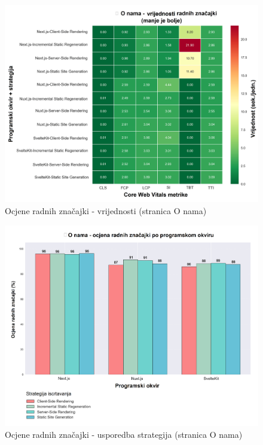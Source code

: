 \begin{figure}[H]
    \centering
    \includegraphics[width=\textwidth]{slike/rezultati/about/about_performance_values.png}
    \caption{Ocjene radnih značajki - vrijednosti (stranica O nama)}
    \label{fig:testiranje-o-nama-vrijednosti}
\end{figure}

\begin{figure}[H]
    \centering
    \includegraphics[width=\textwidth]{slike/rezultati/about/about_strategy_comparison.png}
    \caption{Ocjene radnih značajki - usporedba strategija (stranica O nama)}
    \label{fig:testiranje-o-nama-usporedba-strategija}
\end{figure}

